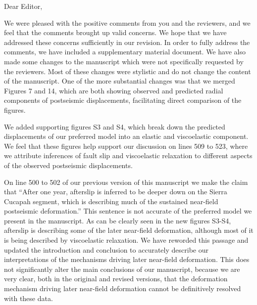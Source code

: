 \documentclass[10pt,a4paper]{letter}
\begin{document}
\signature{Trever T. Hines}

\begin{letter}{}
\opening{Dear Editor,}





We were pleased with the positive comments from you and the reviewers,
and we feel that the comments brought up valid concerns. We hope that
we have addressed these concerns sufficiently in our revision. In
order to fully address the comments, we have included a supplementary
material document.  We have also made some changes to the manuscript
which were not specifically requested by the reviewers.  Most of these
changes were stylistic and do not change the content of the
manuscript.  One of the more substantial changes was that we merged
Figures 7 and 14, which are both showing observed and predicted radial
components of postseismic displacements, facilitating direct
comparison of the figures.

We added supporting figures S3 and S4, which break down the predicted
displacements of our preferred model into an elastic and viscoelastic
component.  We feel that these figures help support our discussion on
lines 509 to 523, where we attribute inferences of fault slip and
viscoelastic relaxation to different aspects of the observed
postseismic displacements.

On line 500 to 502 of our previous version of this manuscript we make
the claim that “After one year, afterslip is inferred to be deeper
down on the Sierra Cucapah segment, which is describing much of the
sustained near-field postseismic deformation.” This sentence is not
accurate of the preferred model we present in the manuscript. As can
be clearly seen in the new figures S3-S4, afterslip is describing some
of the later near-field deformation, although most of it is being
described by viscoelastic relaxation.  We have reworded this passage
and updated the introduction and conclusion to accurately describe our
interpretations of the mechanisms driving later near-field
deformation.  This does not significantly alter the main conclusions
of our manuscript, because we are very clear, both in the original and
revised versions, that the deformation mechanism driving later
near-field deformation cannot be definitively resolved with these
data.


\end{letter}
\end{document}
